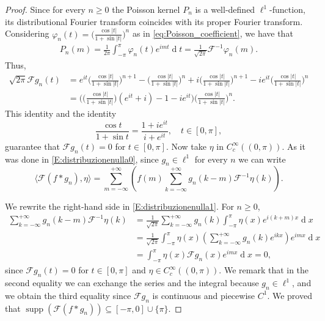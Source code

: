 \documentclass[12pt,a4paper,reqno]{amsart}
\DeclareMathOperator*{\supp}{supp}
\theoremstyle{definition}
\theoremstyle{definition}\newtheorem{defn}[thm]{Definition}
\begin{document}
\begin{proof}
    Since for every $n\geqslant 0$ the Poisson kernel $P_n$ is a well-defined $\ell^1$-function, its distributional Fourier transform coincides with its proper Fourier transform. Considering $\varphi_n(t)=\Big(\frac{\cos|t|}{1+\sin|t|}\Big)^n$ as in \eqref{eq:Poisson_coefficient}, we have that 
    \begin{align*}
     P_n(m)=\frac{1}{2\pi}\int_{-\pi}^{\pi}\varphi_n(t) e^{imt}\operatorname{d}\!t=\frac{1}{\sqrt{2\pi}}\mathcal{F}^{-1}\varphi_n(m).
    \end{align*}
    Thus,
    \begin{align*}
     \sqrt{2\pi} \mathcal F g_n(t)&= e^{it} \Big(\frac{\cos|t| }{1+\sin|t|}\Big)^{n+1}- \Big(\frac{\cos|t| }{1+\sin|t|}\Big)^{n}+i \Big(\frac{\cos|t| }{1+\sin|t|}\Big)^{n+1}-ie^{it} \Big(\frac{\cos|t| }{1+\sin|t|}\Big)^{n}\\
    &=\Big(\Big(\frac{\cos|t| }{1+\sin|t|}\Big)(e^{it}+i)-1-ie^{it}\Big)\Big(\frac{\cos|t| }{1+\sin|t|}\Big)^n.
    \end{align*}
    This identity and the identity
    \[
    \frac{\cos t}{1+\sin t}=\frac{1+ie^{it}}{i+e^{it}},\quad t\in [0,\pi],
    \]
    guarantee that $\mathcal F g_n(t)=0$ for $t\in [0,\pi]$. Now take $\eta$ in $C_c^\infty((0,\pi)).$ As it was done in \eqref{E:distribuzionenulla0}, since $g_n\in\ell^1$ for every $n$ we can write
    \begin{equation}\label{E:distribuzionenulla1}
         \langle \mathcal F(f\ast  g_n),\eta\rangle =\sum_{m=-\infty}^{+\infty} \left(f(m)\sum_{k=-\infty}^{+\infty} g_n(k-m) \mathcal{F}^{-1}\eta(k)\right).
    \end{equation}
    
    We rewrite the right-hand side in \eqref{E:distribuzionenulla1}. For $n\geqslant 0$,
    \begin{align*}
        \sum_{k=-\infty}^{+\infty} g_n(k-m) \mathcal{F}^{-1}\eta(k)&=\frac{1}{\sqrt{2\pi}}\sum_{k=-\infty}^{+\infty} g_n(k) \int_{-\pi}^{\pi}\eta(x)e^{ i(k+m)x}\operatorname{d}\!x\\
        &=\frac{1}{\sqrt{2\pi}}\int_{-\pi}^{\pi}\eta(x)\left(\sum_{k=-\infty}^{+\infty} g_n(k)e^{ikx}\right)e^{imx}\operatorname{d}\!x \\
        &=\int_{-\pi}^{\pi}\eta(x)\mathcal{F}g_n(x)e^{imx}\operatorname{d}\!x=0,
    \end{align*}
    since $\mathcal F g_n(t)=0$ for $t\in [0,\pi]$ and $\eta\in C_c^\infty((0,\pi)).$ We remark that in the second equality we can exchange the series and the integral because $g_n\in\ell^1$, and we obtain the third equality since $\mathcal{F}g_n$ is continuous and piecewise $C^1$. We proved that $\supp(\mathcal F(f\ast  g_n))\subseteq [-\pi,0]\cup\{\pi\}$.
    

\end{proof}
\end{document}
